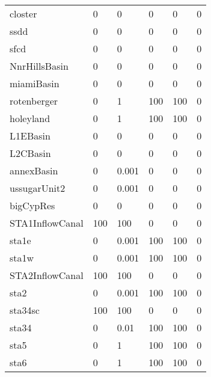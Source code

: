 \begin{table}[!htb]
\begin{center}
\begin{tabular}{p{2.5cm}p{2.2cm}p{2.2cm}p{2.2cm}p{2.2cm}p{2.2cm}}
  closter         &   0         &    0          &    0         &     0         &    0 \\
  ssdd            &   0         &    0          &    0         &     0         &    0 \\
  sfcd            &   0         &    0          &    0         &     0         &    0 \\
  NnrHillsBasin   &   0         &    0          &    0         &     0         &    0 \\
  miamiBasin      &   0         &    0          &    0         &     0         &    0 \\
  rotenberger     &   0         &    1          &  100         &   100         &    0 \\
  holeyland       &   0         &    1          &  100         &   100         &    0 \\
  L1EBasin        &   0         &    0          &    0         &     0         &    0 \\
  L2CBasin        &   0         &    0          &    0         &     0         &    0 \\
  annexBasin      &   0         &    0.001      &    0         &     0         &    0 \\
  ussugarUnit2    &   0         &    0.001      &    0         &     0         &    0 \\
  bigCypRes       &   0         &    0          &    0         &     0         &    0 \\
  STA1InflowCanal & 100         &  100          &    0         &     0         &    0 \\
  sta1e           &   0         &    0.001      &  100         &   100         &    0 \\
  sta1w           &   0         &    0.001      &  100         &   100         &    0 \\
  STA2InflowCanal & 100         &  100          &    0         &     0         &    0 \\
  sta2            &   0         &    0.001      &  100         &   100         &    0 \\
  sta34sc         & 100         &  100          &    0         &     0         &    0 \\
  sta34           &   0         &    0.01       &  100         &   100         &    0 \\
  sta5            &   0         &    1          &  100         &   100         &    0 \\
  sta6            &   0         &    1          &  100         &   100         &    0 \\

\end{tabular}
\end{center}
\end{table}
